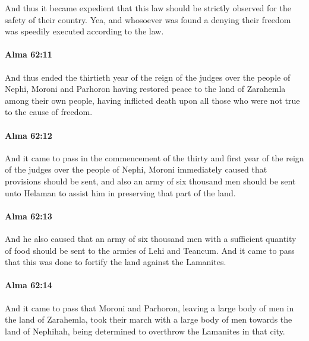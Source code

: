 			And thus it became expedient
			that this law should be strictly observed for the safety of their country.
			Yea, and whosoever was found a denying their freedom
			was speedily executed according to the law.

		\paragraph{Alma 62:11} %
			\label{ALMA-62-11}

			And thus ended the thirtieth year
			of the reign of the judges over the people of Nephi,
			Moroni and Parhoron having restored peace
			to the land of Zarahemla among their own people,
			having inflicted death upon all those who were not true to the cause of freedom.

		\paragraph{Alma 62:12} %
			\label{ALMA-62-12}

			And it came to pass in the commencement of the thirty and first year
			of the reign of the judges over the people of Nephi,
			Moroni immediately caused that provisions should be sent,
			and also an army of six thousand men should be sent unto Helaman
			to assist him in preserving that part of the land.

		\paragraph{Alma 62:13} %
			\label{ALMA-62-13}

			And he also caused that an army of six thousand men
			with a sufficient quantity of food
			should be sent to the armies of Lehi and Teancum.
			And it came to pass that this was done to fortify the land against the Lamanites.

		\paragraph{Alma 62:14} %
			\label{ALMA-62-14}

			And it came to pass that Moroni and Parhoron,
			leaving a large body of men in the land of Zarahemla,
			took their march with a large body of men towards the land of Nephihah,
			being determined to overthrow the Lamanites in that city.

